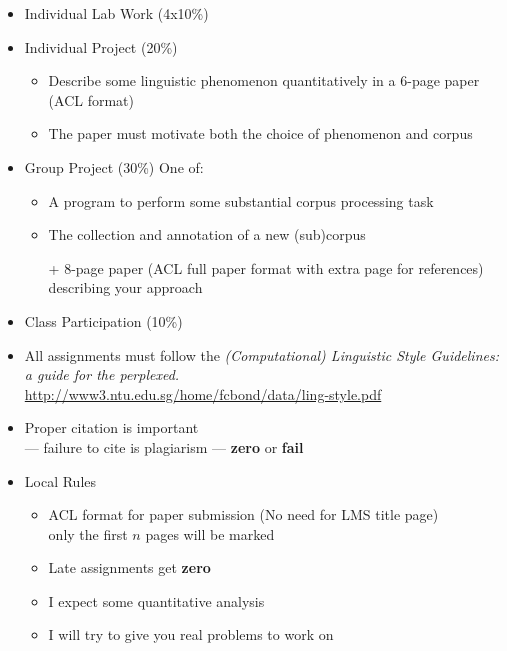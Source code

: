 \documentclass[a4paper,landscape,headrule,footrule]{foils}
\begin{document}


\begin{itemize}
\item Individual Lab Work (4x10\%)
\item Individual Project (20\%) 
  \begin{itemize}
  \item  Describe some linguistic phenomenon quantitatively in a 6-page paper (ACL format)
  \item The paper must motivate both the choice of phenomenon and corpus
  \end{itemize}
\item Group Project (30\%) One of:
  \begin{itemize}
  \item A program to perform some substantial corpus processing task
  \item The collection and annotation of a new (sub)corpus
  \item[+]     8-page paper (ACL full paper format with extra page for references) describing your approach
  \end{itemize}
\item Class Participation  (10\%)
\end{itemize}



\begin{itemize}
\item All assignments must follow the \textit{(Computational)
    Linguistic Style Guidelines: a guide for the perplexed. } \\
  \url{http://www3.ntu.edu.sg/home/fcbond/data/ling-style.pdf}
\item Proper citation is important 
    \\ --- failure to cite is plagiarism --- \textbf{zero} or \textbf{fail}
\item Local Rules
  \begin{itemize}
  \item ACL format for paper submission (No need for LMS title page)
    \\ only the first $n$ pages will be marked
  \item Late assignments get \textbf{zero}
  \item I expect some quantitative analysis
  \item I will try to give you real problems to work on
  \end{itemize}
\end{itemize}
\end{document}
